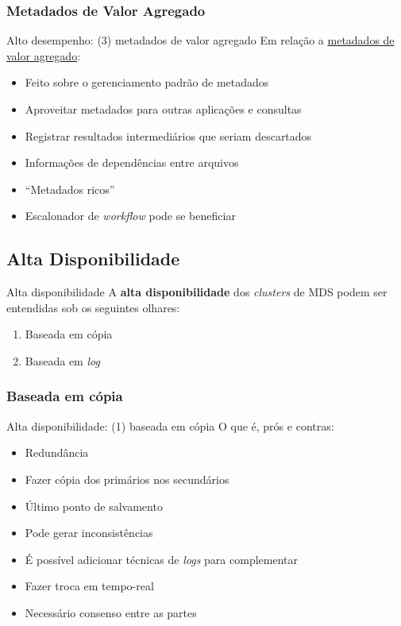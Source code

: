 \documentclass[xcolor=dvipsnames,table]{beamer}
\begin{document}
\subsubsection{Metadados de Valor Agregado}
\begin{frame}{Alto desempenho: (3) metadados de valor agregado}
	Em relação a \underline{metadados de valor agregado}:
	\begin{itemize}
		\item Feito sobre o gerenciamento padrão de metadados
		\item Aproveitar metadados para outras aplicações e consultas
		\item Registrar resultados intermediários que seriam descartados
		\item Informações de dependências entre arquivos
		\item ``Metadados ricos''
		\item Escalonador de \textit{workflow} pode se beneficiar
	\end{itemize}
\end{frame}

\subsection{Alta Disponibilidade}
\begin{frame}{Alta disponibilidade}
	A \textbf{alta disponibilidade} dos \textit{clusters} de MDS podem ser entendidas sob os seguintes olhares:
	\begin{enumerate}
		\item Baseada em cópia
		\item Baseada em \textit{log}
		\end{enumerate}
\end{frame}

\subsubsection{Baseada em cópia}
\begin{frame}{Alta disponibilidade: (1) baseada em cópia}
	O que é, prós e contras:
	\begin{itemize}
		\item Redundância
		\item Fazer cópia dos primários nos secundários
		\item Último ponto de salvamento
		\item Pode gerar inconsistências
		\item É possível adicionar técnicas de \textit{logs} para complementar
		\item Fazer troca em tempo-real
		\item Necessário consenso entre as partes
	\end{itemize}
\end{frame}
\end{document}
